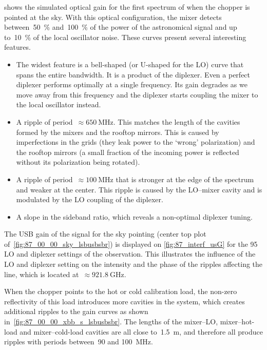  shows the simulated optical gain for the first spectrum of  when the chopper is pointed at the sky.
With this optical configuration, the mixer detects between~\SI{50}{\percent} and~\SI{100}{\percent} of the power of the astronomical signal and up to~\SI{10}{\percent} of the local oscillator noise.
These curves present several interesting features.
\begin{itemize}
    \item The widest feature is a bell-shaped (or U-shaped for the LO) curve that spans the entire bandwidth.  It is a product of the diplexer.  Even a perfect diplexer performs optimally at a single frequency.  Its gain degrades as we move away from this frequency and the diplexer starts coupling the mixer to the local oscillator instead.
    \item A ripple of period~$\approx \SI{650}{\mega\hertz}$.
    This matches the length of the cavities formed by the mixers and the rooftop mirrors.
    This is caused by imperfections in the grids (they leak power to the `wrong' polarization) and the rooftop mirrors (a small fraction of the incoming power is reflected without its polarization being rotated).
    \item A ripple of period~$\approx \SI{100}{\mega\hertz}$ that is stronger at the edge of the spectrum and weaker at the center.
    This ripple is caused by the LO--mixer cavity and is modulated by the LO coupling of the diplexer.
    \item A slope in the sideband ratio, which reveals a non-optimal diplexer tuning.
\end{itemize}

The USB gain of the signal for the sky pointing (center top plot of~\cref{fig:87_00_00_sky_lsbusbsbr}) is displayed on \cref{fig:87_interf_usG} for the 95 LO and diplexer settings of the  observation.
This illustrates the influence of the LO and diplexer setting on the intensity and the phase of the ripples affecting the line, which is located at~$\approx \SI{921.8}{\giga\hertz}$.

When the chopper points to the hot or cold calibration load, the non-zero reflectivity of this load introduces more cavities in the system, which creates additional ripples to the gain curves as shown in~\cref{fig:87_00_00_xbb_s_lsbusbsbr}.
The lengths of the mixer--LO, mixer--hot-load and mixer--cold-load cavities are all close to~\SI{1.5}{\meter}, and therefore all produce ripples with periods between~\num{90} and \SI{100}{\mega\hertz}.

